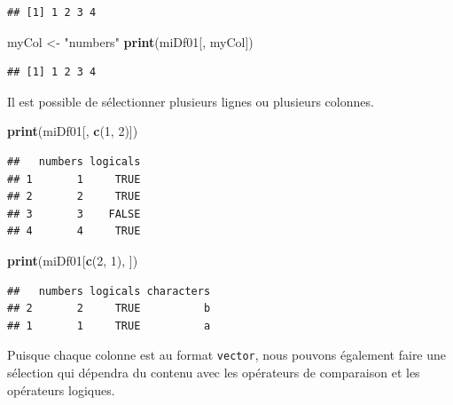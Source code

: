 \documentclass[]{book}
\newenvironment{Shaded}{\begin{snugshade}}{\end{snugshade}}
\newcommand{\DecValTok}[1]{\textcolor[rgb]{0.00,0.00,0.81}{#1}}
\newcommand{\KeywordTok}[1]{\textcolor[rgb]{0.13,0.29,0.53}{\textbf{#1}}}
\newcommand{\NormalTok}[1]{#1}
\newcommand{\OperatorTok}[1]{\textcolor[rgb]{0.81,0.36,0.00}{\textbf{#1}}}
\newcommand{\StringTok}[1]{\textcolor[rgb]{0.31,0.60,0.02}{#1}}
\begin{document}
\begin{verbatim}
## [1] 1 2 3 4
\end{verbatim}

\begin{Shaded}
\begin{Highlighting}[]
\NormalTok{myCol <-}\StringTok{ "numbers"}
\KeywordTok{print}\NormalTok{(miDf01[, myCol])}
\end{Highlighting}
\end{Shaded}

\begin{verbatim}
## [1] 1 2 3 4
\end{verbatim}

Il est possible de sélectionner plusieurs lignes ou plusieurs colonnes.

\begin{Shaded}
\begin{Highlighting}[]
\KeywordTok{print}\NormalTok{(miDf01[, }\KeywordTok{c}\NormalTok{(}\DecValTok{1}\NormalTok{, }\DecValTok{2}\NormalTok{)])}
\end{Highlighting}
\end{Shaded}

\begin{verbatim}
##   numbers logicals
## 1       1     TRUE
## 2       2     TRUE
## 3       3    FALSE
## 4       4     TRUE
\end{verbatim}

\begin{Shaded}
\begin{Highlighting}[]
\KeywordTok{print}\NormalTok{(miDf01[}\KeywordTok{c}\NormalTok{(}\DecValTok{2}\NormalTok{, }\DecValTok{1}\NormalTok{), ])}
\end{Highlighting}
\end{Shaded}

\begin{verbatim}
##   numbers logicals characters
## 2       2     TRUE          b
## 1       1     TRUE          a
\end{verbatim}

Puisque chaque colonne est au format \texttt{vector}, nous pouvons également faire une sélection qui dépendra du contenu avec les opérateurs de comparaison et les opérateurs logiques.

\begin{Shaded}
\end{Shaded}
\end{document}
